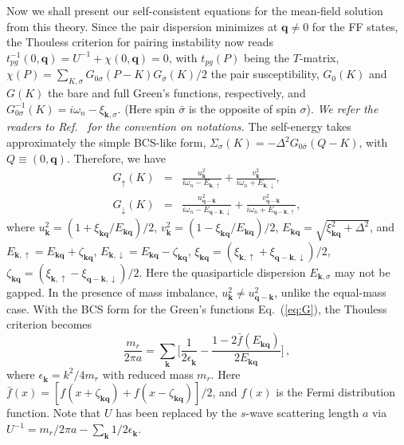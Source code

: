 \documentclass[aps,twocolumn,prl,tightenlines,floatfix]{revtex4-1}
\begin{document}
Now we shall present our self-consistent equations for the mean-field
solution from this theory. 
%
Since the pair dispersion minimizes at $\mathbf{q}\ne 0$ for the FF
states, the Thouless criterion for pairing instability now reads
$t^{-1}_{pg}(0,\textbf{q})=U^{-1}+\chi(0,\textbf{q})=0$, with
$t_{pg}(P)$ being the $T$-matrix,
$\chi(P)=\sum_{K,\sigma}G_{0\sigma}(P-K)G_{\bar{\sigma}}(K)/2$ the
pair susceptibility, $G_0(K)$ and $G(K)$ the bare and full Green's
functions, respectively, and
$G^{-1}_{0\sigma}(K)=i\omega_{n}-\xi_{\textbf{k},\sigma}$. (Here spin
${\bar{\sigma}}$ is the opposite of spin $\sigma$). \emph{We refer the
  readers to Ref.~\cite{wang13pra} for the convention on notations.}
The self-energy \cite{Review} takes approximately the simple BCS-like
form, $\Sigma_{\sigma}(K)=-\Delta^{2}G_{0\bar{\sigma}}(Q-K)$, with $
Q\equiv (0, \mathbf{q})$.
%
Therefore, we have
\begin{subequations}
\label{eq:G}
\begin{eqnarray}
G_{\uparrow}(K)&=&\frac{u_{\textbf{k}}^{2}}{i\omega_{n}-E_{\textbf{k},\uparrow}}+
\frac{v_{\textbf{k}}^{2}}{i\omega_{n}+E_{\textbf{k},\downarrow}},\\
G_{\downarrow}(K)&=&\frac{u^{2}_{\mathbf{q-k}}}{i\omega_{n}-E_{\mathbf{q-k},\downarrow}}+
\frac{v^{2}_{\mathbf{q-k}}}{i\omega_{n}+E_{\mathbf{q-k},\uparrow}},
\end{eqnarray}
\end{subequations}
where $u_{\textbf{k}}^{2}=(1+\xi_{\textbf{kq}}/E_{\textbf{kq}})/2$,
$v_{\textbf{k}}^{2}=(1-\xi_{\textbf{kq}}/E_{\textbf{kq}})/2$,
$E_{\textbf{kq}}=\sqrt{\xi_{\textbf{kq}}^{2}+\Delta^{2}}$, and
$E_{\textbf{k},\uparrow}=E_{\textbf{kq}}+\zeta_{\textbf{kq}}$,
$E_{\textbf{k},\downarrow}=E_{\textbf{kq}}-\zeta_{\textbf{kq}}$,
$\xi_{\textbf{kq}}=(\xi_{\textbf{k},\uparrow}
+\xi_{\textbf{q}-\textbf{k},\downarrow})/2$,
$\zeta_{\textbf{kq}}=(\xi_{\textbf{k},\uparrow}
-\xi_{\textbf{q}-\textbf{k},\downarrow})/2$.  Here the quasiparticle
dispersion $E_{\mathbf{k},\sigma}$ may not be gapped. In the presence
of mass imbalance, $u_{\mathbf{k}}^2 \ne u_{\mathbf{q-k}}^2$, unlike
the equal-mass case.
%
With the BCS form for the Green's functions Eq.~(\ref{eq:G}), the
Thouless criterion becomes
%
\begin{equation}
  \frac{m_{r}}{2\pi a}=\sum_{\textbf{k}}\Big[\frac{1}{2\epsilon_{\textbf{k}}^{}}-
  \frac{1-2\bar{f}(E_{\textbf{kq}})}{2E_{\textbf{kq}}}\Big]\,,
  \label{eq:gap}
\end{equation}
%
where $\epsilon_{\textbf{k}}^{}=k^{2}/4m_{r}$ with reduced mass $m_{r}$. Here
$\bar{f}(x)=[f(x+\zeta_{\textbf{kq}})+f(x-\zeta_{\textbf{kq}})]/2$,
and $f(x)$ is the Fermi distribution function.
Note that $U$ has been replaced by the $s$-wave scattering length $a$
via $U^{-1}=m_{r}/2\pi a-\sum_{\textbf{k}}1/2\epsilon_{\textbf{k}}^{}$.
\end{document}
